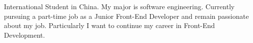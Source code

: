 
\par{
International Student in China. My major is software engineering. Currently pursuing a part-time job as a Junior Front-End Developer and remain passionate about my job. Particularly I want to continue my career in Front-End Development.
}
